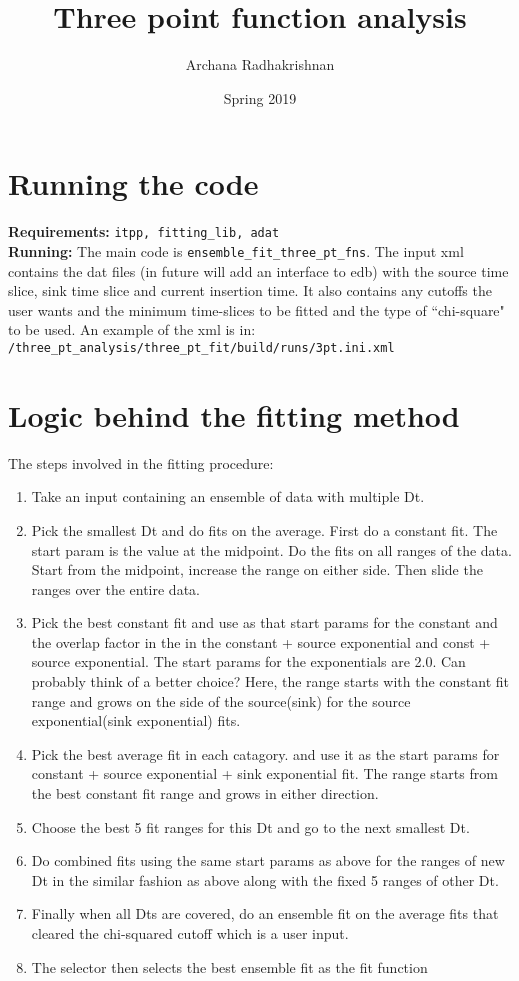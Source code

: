 \documentclass[11pt]{article}
\title{Three point function analysis}
\author{Archana Radhakrishnan}
\date{Spring 2019}
\begin{document}
\maketitle

\section*{Running the code} 
\textbf{Requirements:} \texttt{itpp, fitting\_lib, adat} \\
\textbf{Running:} The main code is \texttt{ensemble_fit_three_pt_fns}. The input xml contains the dat files (in future will add an interface to edb) with the source time slice, sink time slice and current insertion time. It also contains any cutoffs the user wants and the minimum time-slices to be fitted and the type of ``chi-square" to be used. An example of the xml is in:\\ \texttt{/three_pt_analysis/three_pt_fit/build/runs/3pt.ini.xml} \par



\section*{Logic behind the fitting method}
The steps involved in the fitting procedure:\\
\begin{enumerate}
  \item Take an input containing an ensemble of data with multiple Dt.
  \item Pick the smallest Dt and do fits on the average. First do a constant fit. The start param is the value at the midpoint. Do the fits on all ranges of the data. Start from the midpoint, increase the range on either side. Then slide the ranges over the entire data.
  \item Pick the best constant fit and use as that start params for the constant and the overlap factor in the in the  constant + source exponential and  const + source exponential. The start params for the exponentials are 2.0. Can probably think of a better choice? Here, the range starts with the constant fit range and grows on the side of the source(sink) for the source exponential(sink exponential) fits. 
  \item Pick the best average fit in each catagory. and use it as the start params for constant + source exponential + sink exponential fit. The range starts from the best constant fit range and grows in either direction.
  \item Choose the best 5 fit ranges for this Dt and go to the next smallest Dt.
  \item Do combined fits using the same start params as above for the ranges of new Dt in the similar fashion as above along with the fixed 5 ranges of other Dt.
  \item Finally when all Dts are covered, do an ensemble fit on the average fits that cleared the chi-squared cutoff which is a user input.
  \item The selector then selects the best ensemble fit as the fit function
\end{enumerate}
\end{document}
